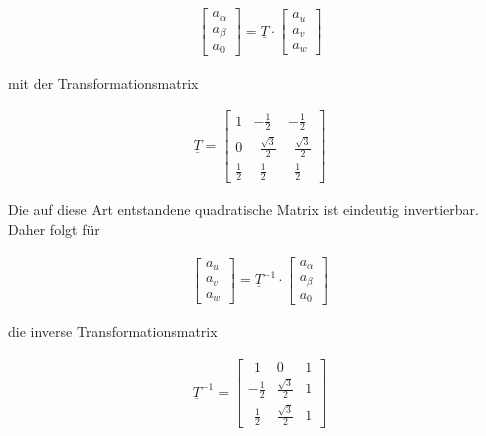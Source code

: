 \begin{align}
	\begin{bmatrix}
		a_{\alpha} \\
		a_{\beta} \\
		a_{0}
	\end{bmatrix}
	=\underline{T}\cdot 
	\begin{bmatrix}
		a_{u} \\
		a_{v} \\
		a_{w}
	\end{bmatrix}
	\label{clarkevektornull}
	\end{align}

mit der Transformationsmatrix

\begin{align}
	\underline{T} =
	\begin{bmatrix}
		1 & -\frac{1}{2} & -\frac{1}{2}  \\
		0 & ~~\frac{\sqrt{3}}{2} & ~~\frac{\sqrt{3}}{2} \\
		\frac{1}{2} & ~~\frac{1}{2} & ~~\frac{1}{2}
	\end{bmatrix}
	\label{clarkematrixnull}
\end{align} 

Die auf diese Art entstandene quadratische Matrix ist eindeutig invertierbar.
Daher folgt für

\begin{align}
	\begin{bmatrix}
	a_{u} \\
	a_{v} \\
	a_{w}
	\end{bmatrix}
	=\underline{T}^{-1}\cdot 
	\begin{bmatrix}
	a_{\alpha} \\
	a_{\beta} \\
	a_{0}
	\end{bmatrix}
	\label{inverseclarkevektornull}
\end{align}

die inverse Transformationsmatrix

\begin{align}
	\underline{T}^{-1} =
	\begin{bmatrix}
		~~1 & 0 & 1  \\
		-\frac{1}{2} & \frac{\sqrt{3}}{2} & 1 \\
		~~\frac{1}{2} & \frac{\sqrt{3}}{2} & 1
	\end{bmatrix}
	\label{inverseclarkematrixnull}
\end{align}

